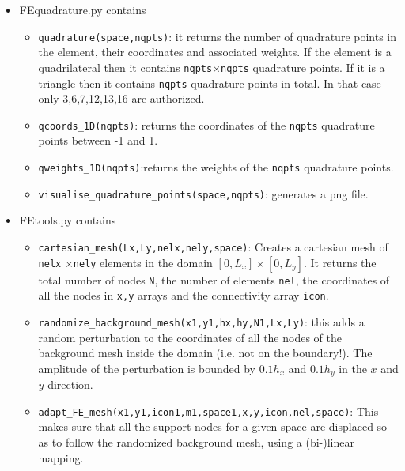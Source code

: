 \begin{itemize}
\item {\pythonfile FEquadrature.py} contains
\begin{itemize}
\item \lstinline{quadrature(space,nqpts)}: it returns the number of quadrature points in the element, 
their coordinates and associated weights. If the element is a quadrilateral then it contains 
\lstinline{nqpts}$\times$\lstinline{nqpts} quadrature points. 
If it is a triangle then it contains \lstinline{nqpts} quadrature points in total. 
In that case only 3,6,7,12,13,16 are authorized.   
\item \lstinline{qcoords_1D(nqpts)}: returns the coordinates of the \lstinline{nqpts} quadrature points between -1 and 1.
\item \lstinline{qweights_1D(nqpts)}:returns the weights of the \lstinline{nqpts} quadrature points.
\item \lstinline{visualise_quadrature_points(space,nqpts)}: generates a png file.
\end{itemize}


\item {\pythonfile FEtools.py} contains

\begin{itemize}
\item \lstinline{cartesian_mesh(Lx,Ly,nelx,nely,space)}: Creates a cartesian mesh of \lstinline{nelx}
$\times$\lstinline{nely} elements in the domain $[0,L_x]\times[0,L_y]$. It returns the total 
number of nodes \lstinline{N}, the number of elements \lstinline{nel}, the coordinates of all the 
nodes in \lstinline{x,y} arrays and the connectivity array \lstinline{icon}.
\item \lstinline{randomize_background_mesh(x1,y1,hx,hy,N1,Lx,Ly)}: this adds a random perturbation
to the coordinates of all the nodes of the background mesh inside the domain (i.e. not on the boundary!). 
The amplitude of the perturbation is bounded by $0.1h_x$ and $0.1h_y$ in the $x$ and $y$ direction.
\item \lstinline{adapt_FE_mesh(x1,y1,icon1,m1,space1,x,y,icon,nel,space)}: This makes sure that 
all the support nodes for a given space are displaced so as to follow the randomized 
background mesh, using a (bi-)linear mapping.


\end{itemize}
\end{itemize}

